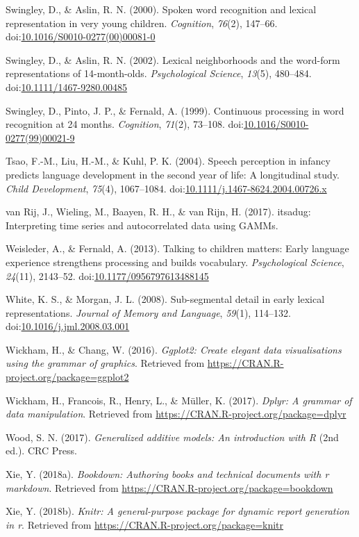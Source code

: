 \documentclass [11pt, proquest] {uwthesis}[2015/03/03]
\begin{document}
\hypertarget{ref-Swingley2000}{}
Swingley, D., \& Aslin, R. N. (2000). Spoken word recognition and
lexical representation in very young children. \emph{Cognition},
\emph{76}(2), 147--66.
doi:\href{https://doi.org/10.1016/S0010-0277(00)00081-0}{10.1016/S0010-0277(00)00081-0}

\hypertarget{ref-Swingley2002}{}
Swingley, D., \& Aslin, R. N. (2002). Lexical neighborhoods and the
word-form representations of 14-month-olds. \emph{Psychological
Science}, \emph{13}(5), 480--484.
doi:\href{https://doi.org/10.1111/1467-9280.00485}{10.1111/1467-9280.00485}

\hypertarget{ref-Swingley1999}{}
Swingley, D., Pinto, J. P., \& Fernald, A. (1999). Continuous processing
in word recognition at 24 months. \emph{Cognition}, \emph{71}(2),
73--108.
doi:\href{https://doi.org/10.1016/S0010-0277(99)00021-9}{10.1016/S0010-0277(99)00021-9}

\hypertarget{ref-Tsao2004}{}
Tsao, F.-M., Liu, H.-M., \& Kuhl, P. K. (2004). Speech perception in
infancy predicts language development in the second year of life: A
longitudinal study. \emph{Child Development}, \emph{75}(4), 1067--1084.
doi:\href{https://doi.org/10.1111/j.1467-8624.2004.00726.x}{10.1111/j.1467-8624.2004.00726.x}

\hypertarget{ref-itsadug}{}
van Rij, J., Wieling, M., Baayen, R. H., \& van Rijn, H. (2017).
itsadug: Interpreting time series and autocorrelated data using GAMMs.

\hypertarget{ref-Weisleder2013}{}
Weisleder, A., \& Fernald, A. (2013). Talking to children matters: Early
language experience strengthens processing and builds vocabulary.
\emph{Psychological Science}, \emph{24}(11), 2143--52.
doi:\href{https://doi.org/10.1177/0956797613488145}{10.1177/0956797613488145}

\hypertarget{ref-WhiteMorgan2008}{}
White, K. S., \& Morgan, J. L. (2008). Sub-segmental detail in early
lexical representations. \emph{Journal of Memory and Language},
\emph{59}(1), 114--132.
doi:\href{https://doi.org/10.1016/j.jml.2008.03.001}{10.1016/j.jml.2008.03.001}

\hypertarget{ref-R-ggplot2}{}
Wickham, H., \& Chang, W. (2016). \emph{Ggplot2: Create elegant data
visualisations using the grammar of graphics}. Retrieved from
\url{https://CRAN.R-project.org/package=ggplot2}

\hypertarget{ref-R-dplyr}{}
Wickham, H., Francois, R., Henry, L., \& Müller, K. (2017). \emph{Dplyr:
A grammar of data manipulation}. Retrieved from
\url{https://CRAN.R-project.org/package=dplyr}

\hypertarget{ref-Wood2017}{}
Wood, S. N. (2017). \emph{Generalized additive models: An introduction
with R} (2nd ed.). CRC Press.

\hypertarget{ref-R-bookdown}{}
Xie, Y. (2018a). \emph{Bookdown: Authoring books and technical documents
with r markdown}. Retrieved from
\url{https://CRAN.R-project.org/package=bookdown}

\hypertarget{ref-R-knitr}{}
Xie, Y. (2018b). \emph{Knitr: A general-purpose package for dynamic
report generation in r}. Retrieved from
\url{https://CRAN.R-project.org/package=knitr}
\end{document}
